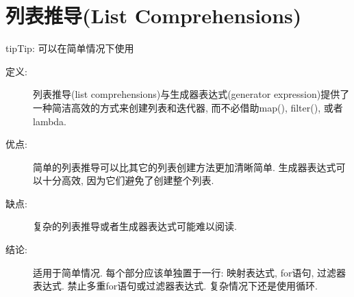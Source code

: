 \documentclass[a4paper,10pt,english]{sphinxmanual}
\begin{document}
\section{列表推导(List Comprehensions)}
\label{\detokenize{python_language_rules:list-comprehensions}}
\begin{sphinxadmonition}{tip}{Tip:}
可以在简单情况下使用
\end{sphinxadmonition}
\begin{description}
\item[{定义:}] \leavevmode
列表推导(list comprehensions)与生成器表达式(generator expression)提供了一种简洁高效的方式来创建列表和迭代器, 而不必借助map(), filter(), 或者lambda.

\item[{优点:}] \leavevmode
简单的列表推导可以比其它的列表创建方法更加清晰简单. 生成器表达式可以十分高效, 因为它们避免了创建整个列表.

\item[{缺点:}] \leavevmode
复杂的列表推导或者生成器表达式可能难以阅读.

\item[{结论:}] \leavevmode
适用于简单情况. 每个部分应该单独置于一行: 映射表达式, for语句, 过滤器表达式. 禁止多重for语句或过滤器表达式. 复杂情况下还是使用循环.

%
\begin{sphinxVerbatim}[commandchars=\\\{\}]
    \PYG{p}{[}\PYG{p}{]}
     
         
               
               

     
         
             
                 
                     
                         


\end{sphinxVerbatim}
\end{description}
\end{document}
